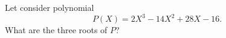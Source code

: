 \bexo
Let consider polynomial  
\begin{equation}
	P(X)=2X^3-14X^2+28X-16.
\end{equation}
What are the three roots of $P$?
\eexo
{}